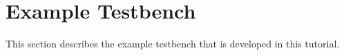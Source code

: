 \section{Example Testbench}

This section describes the example testbench that is developed in this tutorial.
